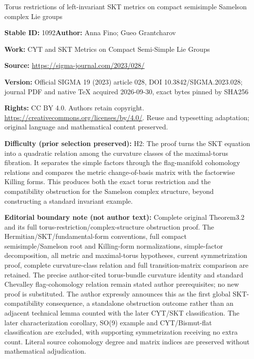 \documentclass[11pt]{article}
\numberwithin{equation}{section}
\numberwithin{equation}{section}
\begin{document}
\begin{center}\Large Torus restrictions of left-invariant SKT metrics on compact semisimple Samelson complex Lie groups\end{center}
\noindent\textbf{Stable ID:} 1092\quad\textbf{Author:} Anna Fino; Gueo Grantcharov\par
\noindent\textbf{Work:} CYT and SKT Metrics on Compact Semi-Simple Lie Groups\par
\noindent\textbf{Source:} \url{https://sigma-journal.com/2023/028/}\par
\noindent\textbf{Version:} Official SIGMA 19 (2023) article 028, DOI 10.3842/SIGMA.2023.028; journal PDF and native TeX acquired 2026-09-30, exact bytes pinned by SHA256\par
\noindent\textbf{Rights:} CC BY 4.0. Authors retain copyright. \url{https://creativecommons.org/licenses/by/4.0/}. Reuse and typesetting adaptation; original language and mathematical content preserved.\par
\noindent\textbf{Difficulty (prior selection preserved):} {\CJKfont H2: The proof turns the SKT equation into a quadratic relation among the curvature classes of the maximal-torus fibration. It separates the simple factors through the flag-manifold cohomology relations and compares the metric change-of-basis matrix with the factorwise Killing forms. This produces both the exact torus restriction and the compatibility obstruction for the Samelson complex structure, beyond constructing a standard invariant example.}\par
\medskip\noindent\textbf{Editorial boundary note (not author text):} Complete original Theorem3.2 and its full torus-restriction/complex-structure obstruction proof. The Hermitian/SKT/fundamental-form conventions, full compact semisimple/Samelson root and Killing-form normalizations, simple-factor decomposition, all metric and maximal-torus hypotheses, current symmetrization proof, complete curvature-class relation and full transition-matrix comparison are retained. The precise author-cited torus-bundle curvature identity and standard Chevalley flag-cohomology relation remain stated author prerequisites; no new proof is substituted. The author expressly announces this as the first global SKT-compatibility consequence, a standalone obstruction outcome rather than an adjacent technical lemma counted with the later CYT/SKT classification. The later characterization corollary, SO(9) example and CYT/Bismut-flat classification are excluded, with supporting symmetrization receiving no extra count. Literal source cohomology degree and matrix indices are preserved without mathematical adjudication.\par
\end{document}
